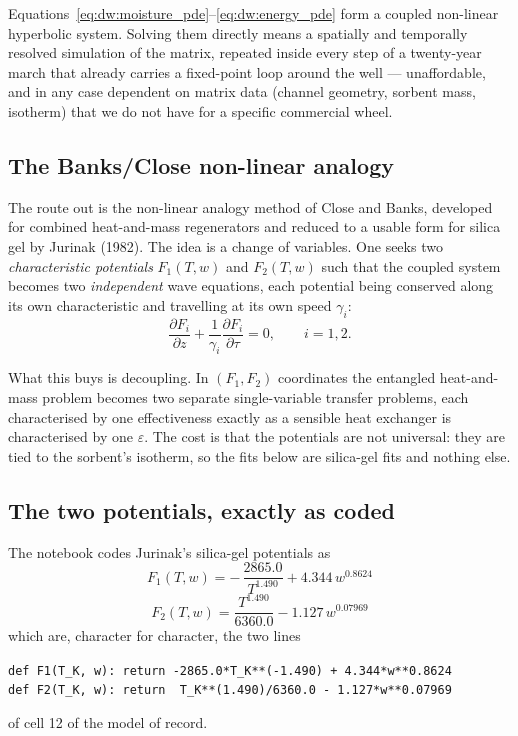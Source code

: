 \documentclass[11pt]{article}
\begin{document}
Equations~\eqref{eq:dw:moisture_pde}--\eqref{eq:dw:energy_pde} form a coupled
non-linear hyperbolic system. Solving them directly means a spatially and
temporally resolved simulation of the matrix, repeated inside every step of a
twenty-year march that already carries a fixed-point loop around the well ---
unaffordable, and in any case dependent on matrix data (channel geometry,
sorbent mass, isotherm) that we do not have for a specific commercial wheel.

\subsection{The Banks/Close non-linear analogy}
\label{sec:dw:analogy}

The route out is the non-linear analogy method of Close and Banks, developed
for combined heat-and-mass regenerators and reduced to a usable form for
silica gel by Jurinak (1982). The idea is a change of variables. One seeks
two \emph{characteristic potentials} $F_1(T,w)$ and $F_2(T,w)$ such that the
coupled system becomes two \emph{independent} wave equations, each potential
being conserved along its own characteristic and travelling at its own speed
$\gamma_i$:
\begin{equation}
\frac{\partial F_i}{\partial z}
+\frac{1}{\gamma_i}\frac{\partial F_i}{\partial \tau}=0,
\qquad i=1,2 .
\label{eq:dw:waves}
\end{equation}

What this buys is decoupling. In $(F_1,F_2)$ coordinates the entangled
heat-and-mass problem becomes two separate single-variable transfer problems,
each characterised by one effectiveness exactly as a sensible heat exchanger
is characterised by one $\varepsilon$. The cost is that the potentials are not
universal: they are tied to the sorbent's isotherm, so the fits below are
silica-gel fits and nothing else.

\subsection{The two potentials, exactly as coded}
\label{sec:dw:potentials}

The notebook codes Jurinak's silica-gel potentials as
\begin{equation}
\boxed{\;
F_1(T,w) = -\,\frac{2865.0}{T^{1.490}} + 4.344\,w^{0.8624}
\;}
\label{eq:dw:F1}
\end{equation}
\begin{equation}
\boxed{\;
F_2(T,w) = \frac{T^{1.490}}{6360.0} - 1.127\,w^{0.07969}
\;}
\label{eq:dw:F2}
\end{equation}
which are, character for character, the two lines
\begin{center}
\texttt{def F1(T\_K, w): return -2865.0*T\_K**(-1.490) + 4.344*w**0.8624}\\
\texttt{def F2(T\_K, w): return\ \ T\_K**(1.490)/6360.0 - 1.127*w**0.07969}
\end{center}
of cell 12 of the model of record.
\end{document}
